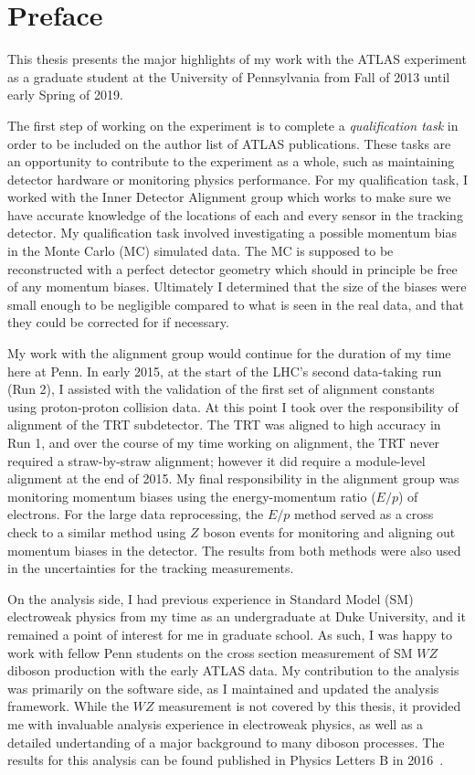 \chapter{Preface}

This thesis presents the major highlights of my work with the ATLAS experiment as a graduate student at the University of Pennsylvania from Fall of 2013 until early Spring of 2019.

The first step of working on the experiment is to complete a \emph{qualification task} in order to be included on the author list of ATLAS publications.
These tasks are an opportunity to contribute to the experiment as a whole, such as maintaining detector hardware or monitoring physics performance.
For my qualification task, I worked with the Inner Detector Alignment group which works to make sure we have accurate knowledge of the locations of each and every sensor in the tracking detector.
My qualification task involved investigating a possible momentum bias in the Monte Carlo (MC) simulated data.
The MC is supposed to be reconstructed with a perfect detector geometry which should in principle be free of any momentum biases.
Ultimately I determined that the size of the biases were small enough to be negligible compared to what is seen in the real data, and that they could be corrected for if necessary.

My work with the alignment group would continue for the duration of my time here at Penn.
In early 2015, at the start of the LHC's second data-taking run (Run 2), I assisted with the validation of the first set of alignment constants using  proton-proton collision data.
At this point I took over the responsibility of alignment of the TRT subdetector.
The TRT was aligned to high accuracy in Run 1, and over the course of my time working on alignment, the TRT never required a straw-by-straw alignment; however it did require a module-level alignment at the end of 2015.
My final responsibility in the alignment group was monitoring momentum biases using the energy-momentum ratio ($E/p$) of electrons.
For the large data reprocessing, the $E/p$ method served as a cross check to a similar method using $Z$ boson events for monitoring and aligning out momentum biases in the detector.
The results from both methods were also used in the uncertainties for the tracking measurements.

On the analysis side, I had previous experience in Standard Model (SM) electroweak physics from my time as an undergraduate at Duke University, and it remained a point of interest for me in graduate school.
As such, I was happy to work with fellow Penn students on the cross section measurement of SM $WZ$ diboson production with the early  ATLAS data.
My contribution to the analysis was primarily on the software side, as I maintained and updated the analysis framework.
While the $WZ$ measurement is not covered by this thesis, it provided me with invaluable analysis experience in electroweak physics, as well as a detailed undertanding of a major background to many diboson processes.
The results for this analysis can be found published in Physics Letters B in 2016~\cite{2016.wz-13tev-physlett}.

